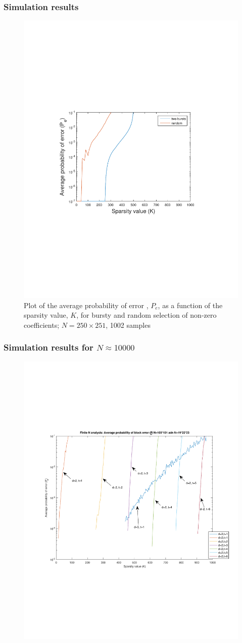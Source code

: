 \documentclass[10pt,xcolor=table]{beamer}
\begin{document}
\begin{frame}
\frametitle{Simulation results}
\begin{figure}[t]
\centering
\includegraphics[width=3.5 in]{Average_Perror_K_250_251_semilog.pdf}
\vspace{-4mm}
\caption{Plot of the average probability of error , $P_e$, as a function of the sparsity value, $K$, for bursty and random selection of non-zero coefficients; $N=250\times251$, 1002 samples}
\label{fig:probofsuccess250_251}
\end{figure}

\end{frame}
\begin{frame}
\frametitle{Simulation results for $N \approx 10000$}
\begin{figure}[t]
\centering
\includegraphics[width=3.5 in]{Finite_N_analysis_block}
\end{figure}

\end{frame}
\end{document}
